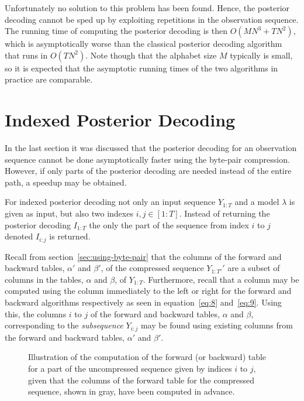 Unfortunately no solution to this problem has been found. Hence, the posterior
decoding cannot be sped up by exploiting repetitions in the observation
sequence. The running time of computing the posterior decoding is then
$O(M N^3 + TN^2)$, which is asymptotically worse than the classical posterior
decoding algorithm that runs in $O(TN^2)$. Note though that the alphabet size
$M$ typically is small, so it is expected that the asymptotic running times of
the two algorithms in practice are comparable.

\section{Indexed Posterior Decoding}

In the last section it was discussed that the posterior decoding for an
observation sequence cannot be done asymptotically faster using the byte-pair
compression. However, if only parts of the posterior decoding are needed
instead of the entire path, a speedup may be obtained.

For indexed posterior decoding not only an input sequence $Y_{1:T}$ and a model
$\lambda$ is given as input, but also two indexes $i,j \in [1:T]$. Instead of
returning the posterior decoding $I_{1:T}$ the only the part of the sequence
from index $i$ to $j$ denoted $I_{i:j}$ is returned.

Recall from section~\ref{sec:using-byte-pair} that the columns of the forward
and backward tables, $\alpha'$ and $\beta'$, of the compressed sequence
$Y_{1:T'}'$ are a subset of columns in the tables, $\alpha$ and $\beta$, of
$Y_{1:T}$. Furthermore, recall that a column may be computed using the column
immediately to the left or right for the forward and backward algorithms
respectively as seen in equation~\eqref{eq:8} and~\eqref{eq:9}. Using this, the
columns $i$ to $j$ of the forward and backward tables, $\alpha$ and $\beta$,
corresponding to the \emph{subsequence} $Y_{i:j}$ may be found using existing
columns from the forward and backward tables, $\alpha'$ and $\beta'$.

\begin{figure}
  \centering
  
  \caption{Illustration of the computation of the forward (or backward) table
    for a part of the uncompressed sequence given by indices $i$ to $j$,
    given that the columns of the forward table for the compressed sequence,
    shown in gray, have been computed in advance.}
  \label{fig:subsequence-posterior}
\end{figure}

